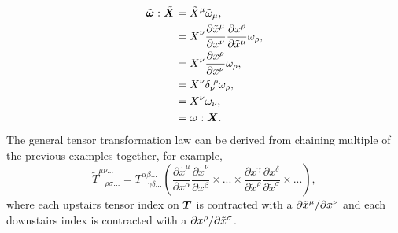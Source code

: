 \begin{align}
\tilde{\boldsymbol \omega} :  \tilde{\boldsymbol X} &= \tilde{X}^\mu \tilde{\omega}_\mu ,\\
                                   &= {X}^\nu \frac{\partial \tilde{x}^\mu}{\partial x^\nu}   \frac{\partial x^\rho}{\partial \tilde{x}^\mu}\omega_\rho, \\
                                   &=X^\nu \frac{\partial x^\rho}{\partial x^\nu} \omega_\rho , \\
                                   &=X^\nu \delta_\nu^{\,\,\rho} \omega_\rho , \\
                                   &=X^\nu\omega_\nu,\\
                                   &= \boldsymbol{\omega}: \boldsymbol{X}.
\end{align}
The general tensor transformation law can be derived from chaining multiple of the previous examples together, for example,
\begin{equation} \label{intro:eq:tensortrans}
\tilde{T}^{\mu\nu...}_{\,\,\,\,\,\rho\sigma...} = T^{\alpha\beta...}_{\,\,\,\,\,\gamma\delta...}\left(
\frac{\partial \tilde{x}^\mu}{\partial x^\alpha}\frac{\partial \tilde{x}^\nu}{\partial x^\beta}\times...\times\frac{\partial x^\gamma}{\partial \tilde{x}^\rho}\frac{\partial x^\delta}{\partial \tilde{x}^\sigma}\times...\right),
\end{equation}
where each upstairs tensor index on $\boldsymbol{T}$ is contracted with a $\partial \tilde{x}^\mu / \partial x^\nu$ and each downstairs index is contracted with a $\partial x^\rho / \partial \tilde{x}^\sigma$.



